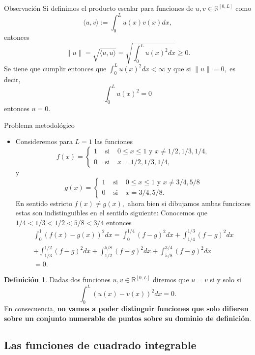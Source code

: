 \documentclass[10pt,handout]{beamer}
\theoremstyle{plain} %
\theoremstyle{plain} %
\theoremstyle{plain} %
\theoremstyle{plain} %
\theoremstyle{definition}
\newtheorem{defn}{Definici\'on}
\theoremstyle{example}
\theoremstyle{example}
\theoremstyle{remark}
\theoremstyle{remark}
\begin{document}
\begin{frame}{Observación}
Si definimos el producto escalar para funciones de  $u,v \in \mathbb{R}^{[0,L]}$ como
$$
\langle u,v \rangle := \int_0^L u(x)v(x) dx,
$$
entonces
$$
\|u\| = \sqrt{\langle u,u \rangle} = \sqrt{ \int_0^L u(x)^2 dx} \ge 0.
$$
Se tiene que cumplir entonces que $\int_0^L u(x)^2 dx < \infty$ y que si $\|u\| = 0,$ es decir, 
$$
\int_0^L u(x)^2 = 0
$$
entonces $u=0.$
\end{frame}

\begin{frame}{Problema metodológico}
\begin{itemize}
\item Consideremos para $L=1$ las funciones
$$
f(x)= \left\{
\begin{array}{ccc}
1 & \text{ si } & 0 \le x \le 1 \text{ y } x\neq 1/2,1/3,1/4, \\ 
0 & \text{ si } & x = 1/2,1/3,1/4,
\end{array}
\right.
$$
y
$$
g(x)= \left\{
\begin{array}{ccc}
1 & \text{ si } & 0 \le x \le 1 \text{ y } x\neq 3/4, 5/8 \\ 
0 & \text{ si } & x = 3/4,5/8.
\end{array}
\right.
$$
En sentido estricto $f(x) \neq g(x),$ ahora bien si dibujamos ambas funciones estas son indistinguibles
en el sentido siguiente: Conocemos que $1/4 < 1/3 < 1/2 < 5/8 < 3/4$ entonces
\begin{align*}
\int_0^1 (f(x)-g(x))^2 dx = \int_0^{1/4} (f-g)^2 dx +  \int_{1/4}^{1/3}(f-g)^2 dx \\
+ \int_{1/3}^{1/2} (f-g)^2 dx + \int_{1/2}^{5/8}(f-g)^2 dx + \int_{5/8}^{3/4} (f-g)^2 dx \\ 
= 0.
\end{align*}
\end{itemize}
\end{frame}

\begin{frame}
\begin{defn}
Dadas dos funciones $u,v \in \mathbb{R}^{[0,L]}$ diremos que $u = v$ si y solo si
$$
\int_0^L (u(x)-v(x))^2 dx = 0.
$$
En consecuencia, \textbf{no vamos a poder distinguir funciones que solo difieren sobre un conjunto numerable
de puntos sobre su dominio de definición}.
\end{defn}
\end{frame}


\subsection{Las funciones de cuadrado integrable}
\end{document}
